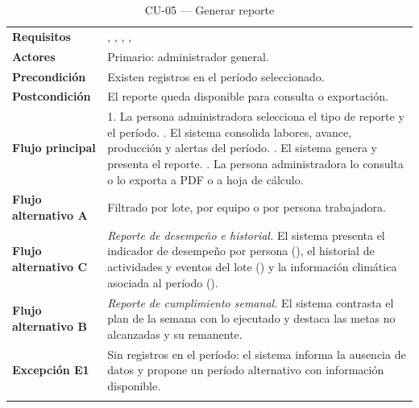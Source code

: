 \begin{longtable}{|L{3.4cm}|L{12.0cm}|}
\hline
{}\\
\hline
\textbf{Requisitos} & , , , ,  \\ \hline
\textbf{Actores} & Primario: administrador general. \\ \hline
\textbf{Precondición} & Existen registros en el período seleccionado. \\ \hline
\textbf{Postcondición} & El reporte queda disponible para consulta o exportación. \\ \hline
\textbf{Flujo principal} & 1. La persona administradora selecciona el tipo de reporte y el período. . El sistema consolida labores, avance, producción y alertas del período. . El sistema genera y presenta el reporte. . La persona administradora lo consulta o lo exporta a PDF o a hoja de cálculo. \\ \hline
\textbf{Flujo alternativo A} & Filtrado por lote, por equipo o por persona trabajadora. \\ \hline
\textbf{Flujo alternativo C} & \emph{Reporte de desempeño e historial.} El sistema presenta el indicador de desempeño por persona (), el historial de actividades y eventos del lote () y la información climática asociada al período (). \\ \hline
\textbf{Flujo alternativo B} & \emph{Reporte de cumplimiento semanal.} El sistema contrasta el plan de la semana con lo ejecutado y destaca las metas no alcanzadas y su remanente. \\ \hline
\textbf{Excepción E1} & Sin registros en el período: el sistema informa la ausencia de datos y propone un período alternativo con información disponible. \\ \hline
\caption{CU-05 --- Generar reporte}
\end{longtable}

